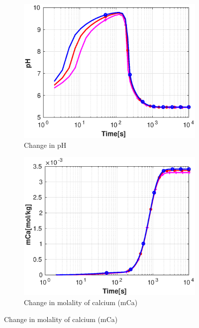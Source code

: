 \begin{figure}[!h]
        \centering
    \begin{subfigure}{.5\linewidth}
            \centering
        \includegraphics[width=\textwidth]{PICTURES/with_grid_pH.eps}
        \caption{\small Change in pH}
        \label{fig:gridpH}
    \end{subfigure}%
        \hfill
    \begin{subfigure}{.5\linewidth}
            \centering
        \includegraphics[width=\textwidth]{PICTURES/with_grid_mCa.eps}
        \caption{\small Change in molality of calcium (mCa)}
        \label{fig:gridmCa}

\end{subfigure}
\end{figure}
